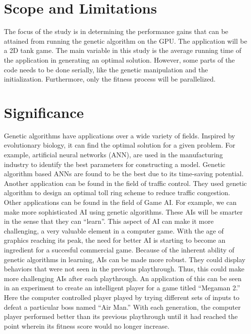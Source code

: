 \section{Scope and Limitations}

The focus of the study is in determining the performance gains that can be attained from
running the genetic algorithm on the GPU. The application will be a 2D tank game. The main 
variable in this study is the average running time of the application in generating 
an optimal solution. However, some parts of the code needs to be done serially, like the
genetic manipulation and the initialization. Furthermore, only the fitness process will be
parallelized.


\section{Significance}

Genetic algorithms have applications over a wide variety of fields.
Inspired by evolutionary biology, it can find the optimal solution
for a given problem. For example, artificial neural networks (ANN),
are used in the manufacturing industry to identify the best parameters
for constructing a model. Genetic algorithm based ANNs are found to be
the best due to its time-saving potential\cite{Venkatesan08}. Another
application can be found in the field of traffic control. They used
genetic algorithm to design an optimal toll ring scheme to reduce traffic
congestion\cite{Sumalee08}. Other applications can be found in the field
of Game AI. For example, we can make more sophisticated AI using genetic
algorithms. These AIs will be smarter in the sense that they can ``learn''.
This aspect of AI can make it more challenging, a very valuable element
in a computer game. With the age of graphics reaching its peak, the need
for better AI is starting to become an ingredient for a succesful
commercial game\cite{Yue06}. Because of the inherent ability of genetic
algorithms in learning, AIs can be made more robust. They could display
behaviors that were not seen in the previous playthrough. Thus, this
could make more challenging AIs after each playthrough. An application
of this can be seen in an experiment to create an intelligent player
for a game titled ``Megaman 2.'' Here the
computer controlled player played by trying different sets of inputs
to defeat a particular boss named ``Air Man.'' With each generation,
the computer player performed better than its previous playthrough
until it had reached the point wherein its fitness score would no longer
increase\cite{website:Kuliniewicz09}.


